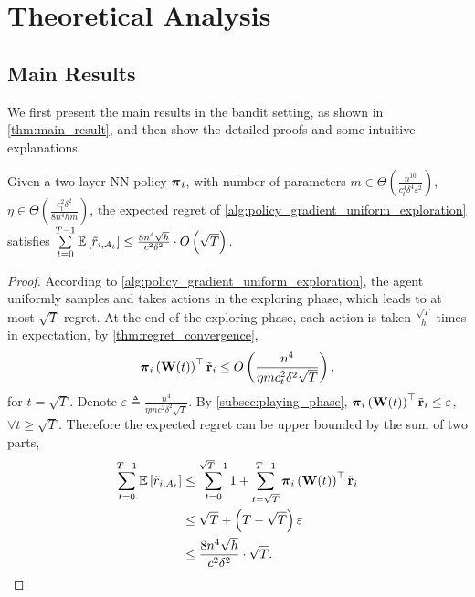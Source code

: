 \section{Theoretical Analysis}
\label{sec:theoretical_analysis}

\subsection{Main Results}
\label{subsec:main_results}

We first present the main results in the bandit setting, as shown in \cref{thm:main_result}, and then show the detailed proofs and some intuitive explanations.

\begin{thm}
\label{thm:main_result}
    Given a two layer NN policy ${\boldsymbol{\pi}}_i$, with number of parameters $m \in \Theta\left( \frac{n^{10}}{c_t^4 \delta^4 \varepsilon^2} \right)$, $\eta \in \Theta\left( \frac{c_t^2 \delta^2}{8 n^4 h m} \right)$, the expected regret of \cref{alg:policy_gradient_uniform_exploration} satisfies $\sum\limits_{t=0}^{T-1}{ {\mathbb{E}} \left[ \tilde{r}_{i, A_t} \right] } \le  \frac{8 n^4 \sqrt{h}}{c^2 \delta^2} \cdot O\left( \sqrt{T} \right)$.
\end{thm}
\begin{proof}
According to \cref{alg:policy_gradient_uniform_exploration}, the agent uniformly samples and takes actions in the exploring phase, which leads to at most $\sqrt{T}$ regret. At the end of the exploring phase, each action is taken $\frac{\sqrt{T}}{h}$ times in expectation, by \cref{thm:regret_convergence}, 
\begin{equation*}
\begin{split}
    {\boldsymbol{\pi}}_i\left( {\mathbf{W}}(t) \right)^\top {\tilde{\mathbf{r}}}_i \le O\left( \frac{n^4}{\eta m c_t^2 \delta^2 \sqrt{T}} \right),
\end{split}
\end{equation*}
for $t = \sqrt{T}$. Denote $\varepsilon \triangleq \frac{n^4}{\eta m c^2 \delta^2 \sqrt{T}}$. By \cref{subsec:playing_phase}, ${\boldsymbol{\pi}}_i\left( {\mathbf{W}}(t) \right)^\top {\tilde{\mathbf{r}}}_i \le \varepsilon$, $\forall t \ge \sqrt{T}$. Therefore the expected regret can be upper bounded by the sum of two parts,
\begin{equation*}
\begin{split}
    \sum\limits_{t=0}^{T-1}{ {\mathbb{E}} \left[ \tilde{r}_{i, A_t} \right] } &\le \sum\limits_{t=0}^{\sqrt{T}-1}{ 1 } + \sum\limits_{t=\sqrt{T}}^{T-1}{ {\boldsymbol{\pi}}_i\left( {\mathbf{W}}(t) \right)^\top {\tilde{\mathbf{r}}}_i } \\
    &\le \sqrt{T} + \left( T - \sqrt{T} \right) \varepsilon \\
    &\le \frac{8 n^4 \sqrt{h}}{c^2 \delta^2} \cdot \sqrt{T}. \qedhere
\end{split}
\end{equation*}
\end{proof}

